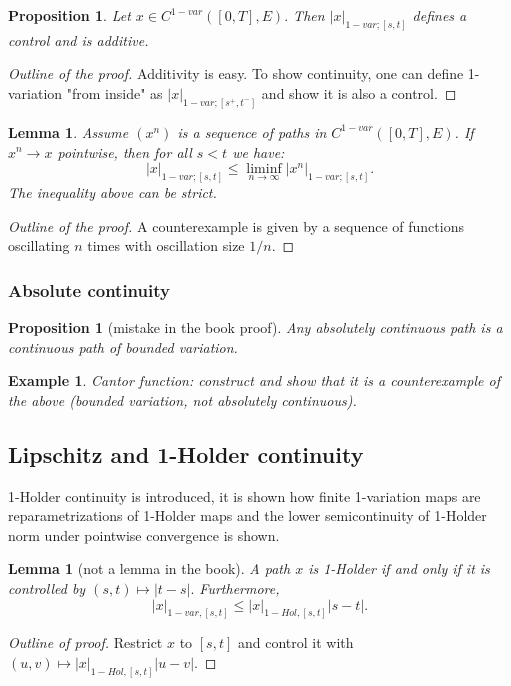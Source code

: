 \documentclass{article}
\newtheorem{prop}[theorem]{Proposition}
\newtheorem{lemma}[theorem]{Lemma}
\newtheorem{example}{Example}
\begin{document}
\begin{prop}
    Let $x \in C^{1-var}([0,T],E).$ Then $|x|_{1-var; [s,t]}$ defines a control and is additive.    
\end{prop}
\begin{proof}[Outline of the proof]
    Additivity is easy.
    To show continuity, one can define 1-variation "from inside" as $|x|_{1-var; [s^+,t^-]}$ and show it is also a control.
\end{proof}
\begin{lemma}
    Assume $(x^n)$ is a sequence of paths in $C^{1-var}([0,T],E)$. If $x^n \rightarrow x$ pointwise, then for all $s < t$ we have:
    \begin{equation}
        |x|_{1-var; [s,t]} \leq \liminf_{n \rightarrow \infty} |x^n|_{1-var; [s,t]}.
    \end{equation}
    The inequality above can be strict.
\end{lemma}
\begin{proof}[Outline of the proof]
    A counterexample is given by a sequence of functions oscillating $n$ times with oscillation size $1/n$.
\end{proof}
\subsubsection{Absolute continuity}

\begin{prop}[mistake in the book proof]
    Any absolutely continuous path is a continuous path of bounded variation.
\end{prop}

\begin{example}
    Cantor function: construct and show that it is a counterexample of the above (bounded variation, not absolutely continuous).
\end{example}

\subsection{Lipschitz and 1-Holder continuity}

1-Holder continuity is introduced, it is shown how finite 1-variation maps are reparametrizations of 1-Holder maps and the lower semicontinuity of 1-Holder norm under pointwise convergence is shown.

\begin{lemma}[not a lemma in the book]\label{lem:HolderControl}
    A path $x$ is 1-Holder if and only if it is controlled by $(s,t) \mapsto |t-s|.$
    Furthermore, 
    \begin{equation}
    |x|_{1-var,[s,t]} \leq |x|_{1-Hol,[s,t]}|s-t|.
    \end{equation}
\end{lemma}
\begin{proof}[Outline of proof]
Restrict $x$ to $[s,t]$ and control it with $(u,v) \mapsto |x|_{1-Hol,[s,t]}|u-v|.$
\end{proof}
\end{document}
